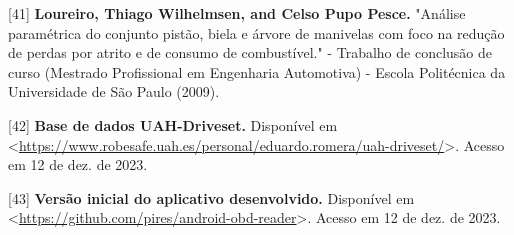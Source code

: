 [41] \textbf{Loureiro, Thiago Wilhelmsen, and Celso Pupo Pesce.} "Análise paramétrica do conjunto pistão, biela e árvore de manivelas com foco na redução de perdas por atrito e de consumo de combustível." - Trabalho de conclusão de curso (Mestrado Profissional em
Engenharia Automotiva) - Escola Politécnica da Universidade de São Paulo (2009).


[42] \textbf{Base de dados UAH-Driveset.} Disponível em <\url{https://www.robesafe.uah.es/personal/eduardo.romera/uah-driveset/}>. Acesso em 12 de dez. de 2023.


[43] \textbf{Versão inicial do aplicativo desenvolvido.} Disponível em <\url{https://github.com/pires/android-obd-reader}>. Acesso em 12 de dez. de 2023.


